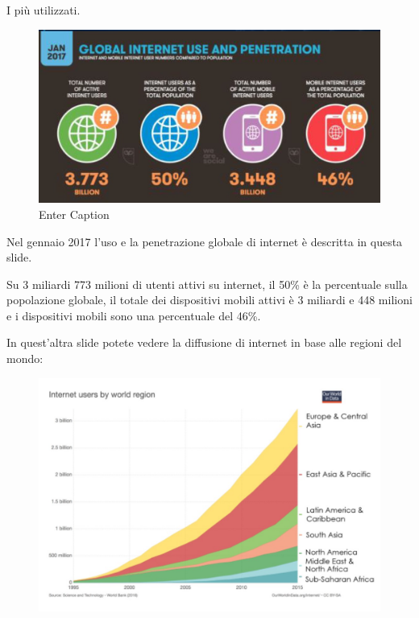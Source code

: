        I più utilizzati. 
       \begin{figure}[h]
           \centering
           \includegraphics[width=1\linewidth]{images/03_lez_fig_05.jpg}
           \caption{Enter Caption}
           \label{fig:enter-label}
       \end{figure}
       
       Nel gennaio 2017 l'uso e la penetrazione globale di internet è descritta in questa slide. \par
       Su 3 miliardi 773 milioni di utenti attivi su internet, il 50\% è la percentuale sulla popolazione globale, il totale dei dispositivi mobili attivi è 3 miliardi e 448 milioni e i dispositivi mobili sono una percentuale del 46\%. \par
       
       In quest'altra slide potete vedere la diffusione di internet in base alle regioni del mondo:
       \begin{figure}[h]
           \centering
           \includegraphics[width=0.9\linewidth]{images/03_lez_fig_06.jpg}
       \end{figure}
       
